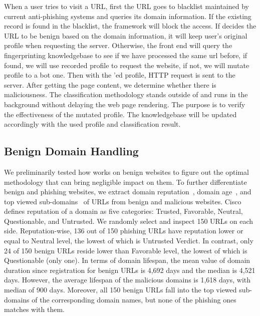 When a user tries to visit a URL, first the URL goes to blacklist maintained by current anti-phishing systems and \spartacus queries its domain information.
If the existing record is found in the blacklist, the framework will block the access. 
If \spartacus decides the URL to be benign based on the domain information, it will keep user's original profile when requesting the server. 
Otherwise, the front end will query the fingerprinting knowledgebase to see if we have processed the same url before, if found, we will use recorded profile to request the website, if not, we will mutate profile to a bot one. Then with the \spartacus'ed profile, HTTP request is sent to the server. After getting the page content, we determine whether there is maliciousness.
The classification methodology stands outside of \spartacus and runs in the background without delaying the web page rendering.
The purpose is to verify the effectiveness of the mutated profile.
The knowledgebase will be updated accordingly with the used profile and classification result.


\subsection{Benign Domain Handling}
\label{ss:benignalg}


We preliminarily tested how \spartacus works on benign websites to figure out the optimal methodology that can bring negligible impact on them.
To further differentiate benign and phishing websites,
we extract domain reputation~\cite{reputation}, domain age~\cite{whois}, and top viewed sub-domains~\cite{topviewedsubdomains} of URLs from benign and malicious websites.
Cisco defines reputation of a domain as five categories: Trusted, Favorable, Neutral, Questionable, and Untrusted.
We randomly select and inspect 150 URLs on each side.
Reputation-wise, 136 out of 150 phishing URLs have reputation lower or equal to Neutral level, the lowest of which is Untrusted Verdict.
In contrast, only 24 of 150 benign URLs reside lower than Favorable level, the lowest of which is Questionable (only one).
In terms of domain lifespan, the mean value of domain duration since registration for benign URLs is 4,692 days and the median is 4,521 days.
However, the average lifespan of the malicious domains is 1,618 days, with median of 900 days.
Moreover, all 150 benign URLs fall into the top viewed sub-domains of the corresponding domain names, but none of the phishing ones matches with them.

